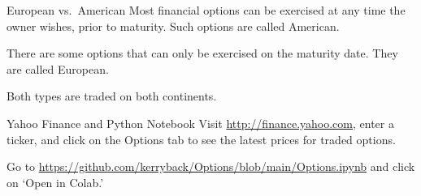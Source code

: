 \documentclass[xcolor=dvipsnames,10pt]{beamer}
\begin{document}
\begin{frame}{European vs.\ American}
    Most financial options can be exercised at any time the owner wishes, prior to maturity.  Such options are called American.
    
    There are some options that can only be exercised on the maturity date.  They are called European.
    
    Both types are traded on both continents.
\end{frame}

\begin{frame}{Yahoo Finance and Python Notebook}
  Visit \url{http://finance.yahoo.com}, enter a ticker, and click on the Options tab to see the latest prices for traded options.
  
  Go to \url{https://github.com/kerryback/Options/blob/main/Options.ipynb} and click on `Open in Colab.'
\end{frame}
\end{document}
